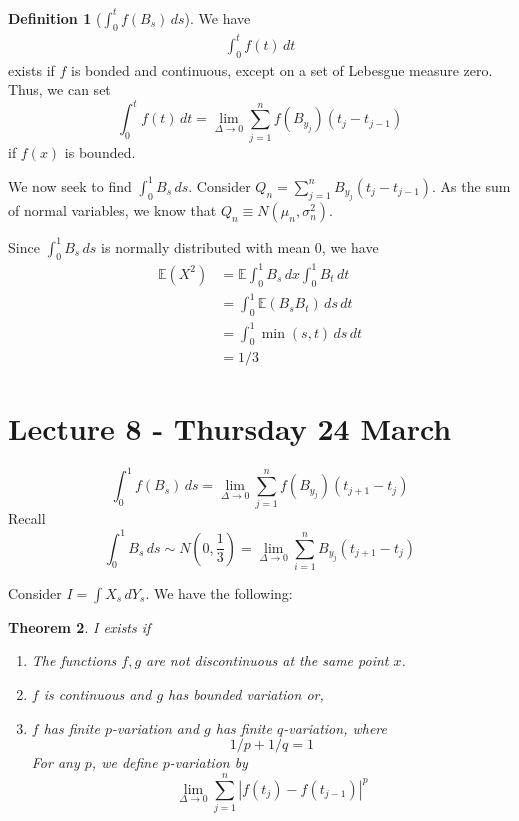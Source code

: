 \documentclass[10pt, oneside, reqno]{amsart}
\theoremstyle{plain}%
\newtheorem{thm}{Theorem}[section]
\theoremstyle{definition}
\newtheorem{defn}[thm]{Definition}
\theoremstyle{remark}
\newcommand{\E}{\mathbb{E}}
\begin{document}
\begin{defn}[$\int_0^t f(B_s) \, ds$]
    
    We have \begin{align*}
    \int_0^t f(t) \, dt
    \end{align*} exists if $f$ is bonded and continuous, except on a set of Lebesgue measure zero.
    Thus, we can set \[
        \int_0^t f(t) \, dt = \lim_{ \Delta \rightarrow 0} \sum_{j=1}^n f(B_{y_j}) (t_j - t_{j-1})
    \] if $f(x)$ is bounded.  
    
    We now seek to find $\int_0^1 B_s \, ds$.  Consider $Q_n = \sum_{j=1}^n B_{y_j} (t_j - t_{j-1})$.  As the sum of normal variables, we know that $Q_n \equiv N(\mu_n, \sigma^2_n)$.      
    
    Since $\int_0^1 B_s \, ds$ is normally distributed with mean 0, we have 
    \begin{align*}
        \E(X^2) &= \E \int_0^1 B_s \, dx \int_0^1 B_t \, dt  \\
                &= \int_0^1 \E(B_s B_t) \, ds \, dt \\
                &= \int_0^1 \min(s,t) \, ds \, dt \\
                &= 1/3
    \end{align*}
\end{defn}


\section{Lecture 8 - Thursday 24 March} %
\label{sec:lecture_8_thursday_24_march}

\[
    \int_0^1 f(B_s) \, ds = \lim_{\Delta \rightarrow 0} \sum_{j=1}^n f(B_{y_j}) (t_{j+1} - t_{j})
\]
Recall \[
    \int_0^1 B_s \, ds \sim N(0, \frac{1}{3}) = \lim_{\Delta \rightarrow 0} \sum_{i=1}^n {B_{y_j}} (t_{j+1} - t_{j})
\]

Consider $I = \int X_s \, dY_s$.  We have the following:
\begin{thm}
    I exists if 
    \begin{enumerate}[(1)]
        \item The functions $f,g$ are not discontinuous at the same point $x$.  
        \item $f$ is continuous and $g$ has bounded variation or,
        \item[(2)'] $f$ has finite $p$-variation and $g$ has finite $q$-variation, where \[
            1/p + 1/q = 1
        \]  For any $p$, we define $p$-variation by \[
            \lim_{\Delta \rightarrow 0} \sum_{j=1}^n |f(t_j) - f(t_{j-1}) |^p
        \]
    \end{enumerate}
\end{thm}
\end{document}

